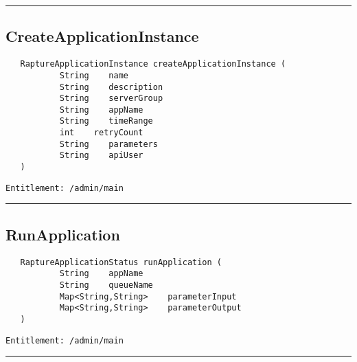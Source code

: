 \rule{12cm}{2pt}
\subsection{CreateApplicationInstance}
\label{Api:CreateApplicationInstance}
\begin{verbatim}
   RaptureApplicationInstance createApplicationInstance (
           String    name
           String    description
           String    serverGroup
           String    appName
           String    timeRange
           int    retryCount
           String    parameters
           String    apiUser
   )
\end{verbatim}
\begin{Verbatim}[fontsize=\small, formatcom=\color{Maroon}]
  Entitlement: /admin/main
\end{Verbatim}



\rule{12cm}{2pt}
\subsection{RunApplication}
\label{Api:RunApplication}
\begin{verbatim}
   RaptureApplicationStatus runApplication (
           String    appName
           String    queueName
           Map<String,String>    parameterInput
           Map<String,String>    parameterOutput
   )
\end{verbatim}
\begin{Verbatim}[fontsize=\small, formatcom=\color{Maroon}]
  Entitlement: /admin/main
\end{Verbatim}



\rule{12cm}{2pt}
